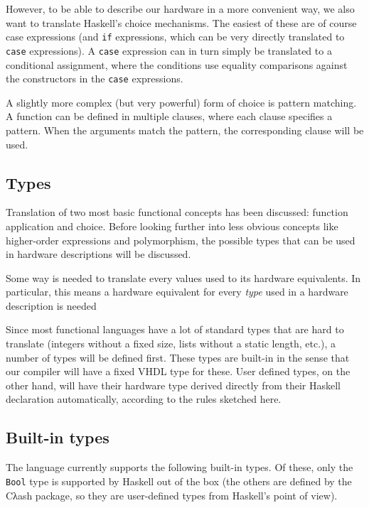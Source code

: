 \documentclass[conference]{IEEEtran}
\def\hs#1{\texttt{#1}}
\begin{document}
    However, to be able to describe our hardware in a more convenient
    way, we also want to translate Haskell's choice mechanisms. The
    easiest of these are of course case expressions (and \hs{if}
    expressions, which can be very directly translated to \hs{case}
    expressions). A \hs{case} expression can in turn simply be
    translated to a conditional assignment, where the conditions use
    equality comparisons against the constructors in the \hs{case}
    expressions.

    A slightly more complex (but very powerful) form of choice is
    pattern matching. A function can be defined in multiple clauses,
    where each clause specifies a pattern. When the arguments match the
    pattern, the corresponding clause will be used.

  \subsection{Types}
    Translation of two most basic functional concepts has been
    discussed: function application and choice. Before looking further
    into less obvious concepts like higher-order expressions and
    polymorphism, the possible types that can be used in hardware
    descriptions will be discussed.

    Some way is needed to translate every values used to its hardware
    equivalents. In particular, this means a hardware equivalent for
    every \emph{type} used in a hardware description is needed

    Since most functional languages have a lot of standard types that
    are hard to translate (integers without a fixed size, lists without
    a static length, etc.), a number of  types will be
    defined first. These types are built-in in the sense that our
    compiler will have a fixed VHDL type for these. User defined types,
    on the other hand, will have their hardware type derived directly
    from their Haskell declaration automatically, according to the rules
    sketched here.

  \subsection{Built-in types}
    The language currently supports the following built-in types. Of these,
    only the \hs{Bool} type is supported by Haskell out of the box (the
    others are defined by the Cλash package, so they are user-defined types
    from Haskell's point of view).
\end{document}
